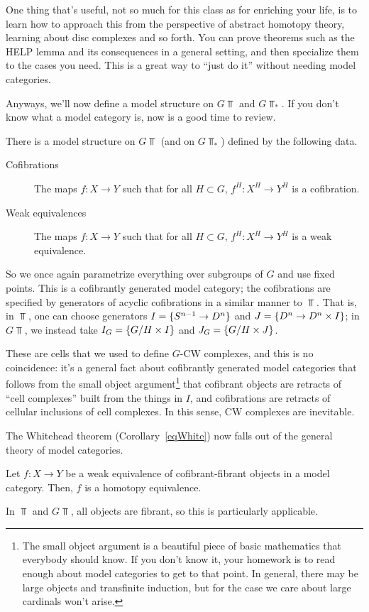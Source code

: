 One thing that's useful, not so much for this class as for enriching your life, is to learn how to approach this
from the perspective of abstract homotopy theory, learning about disc complexes and so forth. You can prove
theorems such as the HELP lemma and its consequences in a general setting, and then specialize them to the cases
you need. This is a great way to ``just do it'' without needing model categories.

Anyways, we'll now define a model structure on $G\Top$ and $G\Top_*$. If you don't know what a model category is,
now is a good time to review.
\begin{prop}
There is a model structure on $G\Top$ (and on $G\Top_*$) defined by the following data.
\begin{description}
	\item[Cofibrations] The maps $f:X\to Y$ such that for all $H\subset G$, $f^H:X^H\to Y^H$ is a cofibration.
	\item[Weak equivalences] The maps $f:X\to Y$ such that for all $H\subset G$, $f^H:X^H\to Y^H$ is a weak
	equivalence.
\end{description}
\end{prop}
So we once again parametrize everything over subgroups of $G$ and use fixed points. This is a cofibrantly generated
model category; the cofibrations are specified by generators of acyclic cofibrations in a similar manner to $\Top$.
That is, in $\Top$, one can choose generators $I = \{S^{n-1}\to D^n\}$ and $J = \{D^n\to D^n\times I\}$; in
$G\Top$, we instead take $I_G = \{G/H\times I\}$ and $J_G = \{G/H\times J\}$.

These are cells that we used to define $G$-CW complexes, and this is no coincidence: it's a general fact about
cofibrantly generated model categories that follows from the small object argument\footnote{The small object
argument is a beautiful piece of basic mathematics that everybody should know. If you don't know it, your homework
is to read enough about model categories to get to that point. In general, there may be large objects and
transfinite induction, but for the case we care about large cardinals won't arise.} that cofibrant objects are
retracts of ``cell complexes'' built from the things in $I$, and cofibrations are retracts of cellular inclusions
of cell complexes. In this sense, CW complexes are inevitable.

The Whitehead theorem (Corollary~\ref{eqWhite}) now falls out of the general theory of model categories.
\begin{thm}
Let $f:X\to Y$ be a weak equivalence of cofibrant-fibrant objects in a model category. Then, $f$ is a homotopy
equivalence.
\end{thm}
In $\Top$ and $G\Top$, all objects are fibrant, so this is particularly applicable.
